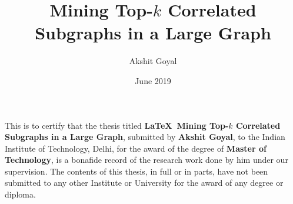 \documentclass[MTech]{iitddiss}
\begin{document}

\title{Mining Top-$k$ Correlated Subgraphs in a Large Graph}

\author{Akshit Goyal}
\date{June 2019}

\maketitle







%
%
%


\certificate

\vspace*{0.5in}

\noindent This is to certify that the thesis titled {\bf \LaTeX\ Mining Top-$k$ Correlated Subgraphs in a Large Graph}, submitted by {\bf Akshit Goyal},
  to the Indian Institute of Technology, Delhi, for
the award of the degree of {\bf Master of Technology}, is a bonafide
record of the research work done by him under our supervision.  The
contents of this thesis, in full or in parts, have not been submitted
to any other Institute or University for the award of any degree or
diploma.
\end{document}
